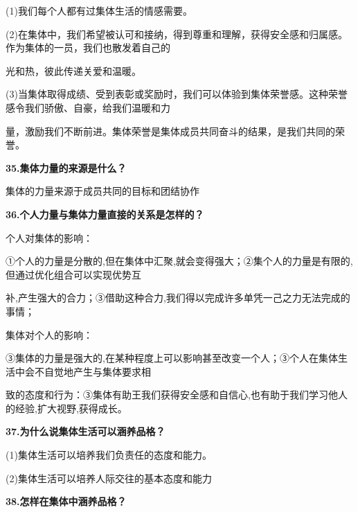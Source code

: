 \documentclass[lang=cn,11pt]{elegantbook}
\newcommand{\daofasym}[1]{{\daofasymbolfont #1}}
\newcommand{\daofasym}[1]{#1}
\begin{document}
(1)我们每个人都有过集体生活的情感需要。\par

(2)在集体中，我们希望被认可和接纳，得到尊重和理解，获得安全感和归属感。作为集体的一员，我们也散发着自己的\par

光和热，彼此传递关爱和温暖。\par

(3)当集体取得成绩、受到表彰或奖励时，我们可以体验到集体荣誉感。这种荣誉感令我们骄傲、自豪，给我们温暖和力\par

量，激励我们不断前进。集体荣誉是集体成员共同奋斗的结果，是我们共同的荣誉。\par

\textbf{35.集体力量的来源是什么？}\par

集体的力量来源于成员共同的目标和团结协作\par

\textbf{36.个人力量与集体力量直接的关系是怎样的？}\par

个人对集体的影响：\par

\daofasym{①}个人的力量是分散的,但在集体中汇聚,就会变得强大；\daofasym{②}集个人的力量是有限的,但通过优化组合可以实现优势互\par

补,产生强大的合力；\daofasym{③}借助这种合力,我们得以完成许多单凭一己之力无法完成的事情；\par

集体对个人的影响：\par

\daofasym{③}集体的力量是强大的,在某种程度上可以影响甚至改变一个人；\daofasym{③}个人在集体生活中会不自觉地产生与集体要求相\par

致的态度和行为：\daofasym{③}集体有助王我们获得安全感和自信心,也有助于我们学习他人的经验,扩大视野,获得成长。\par

\textbf{37.为什么说集体生活可以涵养品格？}\par

(1)集体生活可以培养我们负责任的态度和能力。\par

(2)集体生活可以培养人际交往的基本态度和能力\par

\textbf{38.怎样在集体中涵养品格？}\par
\end{document}
